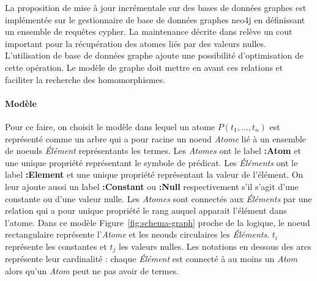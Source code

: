 La proposition de mise à jour incrémentale sur des bases de données graphes est implémentée sur le gestionnaire de base de données graphes \gls{neo4j} en définissant un ensemble de requêtes \gls{cypher}.
La maintenance décrite dans \cite{chabinConsistentUpdatingDatabases2020} relève un cout important pour la récupération des atomes liés par des valeurs nulles.
L'utilisation de base de données graphe ajoute une possibilité d'optimisation de cette opération.
Le modèle de graphe doit mettre en avant ces relations et faciliter la recherche des homomorphismes.

\paragraph{Modèle}
Pour ce faire, on choisit le modèle dans lequel un atome $P(t_1, \dots, t_n)$ est représenté comme un arbre qui a pour racine un noeud \textit{Atome} lié à un ensemble de noeuds \textit{Élément} représentants les termes.
Les \textit{Atomes} ont le label \textbf{:Atom} et une unique propriété représentant le symbole de prédicat.
Les \textit{Éléments} ont le label \textbf{:Element} et une unique propriété représentant la valeur de l'élément.
On leur ajoute aussi un label \textbf{:Constant} ou \textbf{:Null} respectivement s'il s'agit d'une constante ou d'une valeur nulle.
Les \textit{Atomes} sont connectés aux \textit{Éléments} par une relation qui a pour unique propriété le rang auquel apparait l'élément dans l'atome.
Dans ce modèle Figure~\ref{fig:schema-graph} proche de la logique, le noeud rectangulaire représente l'\textit{Atome} et les neouds circulaires les \textit{Éléments}.
$t_i$ représente les constantes et $t_j$ les valeurs nulles.
Les notations en dessous des arcs représente leur cardinalité : chaque \textit{Élément} est connecté à au moins un \textit{Atom} alors qu'un \textit{Atom} peut ne pas avoir de termes.

